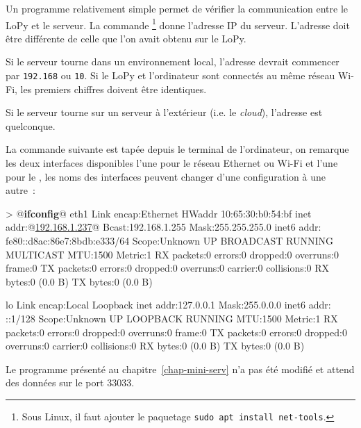 Un programme relativement simple permet de vérifier la communication entre le LoPy et le serveur. La commande \footnote{Sous Linux, il faut ajouter le paquetage  \texttt{sudo apt install net-tools}.} donne l'adresse IP du serveur. L'adresse doit être différente de celle que l'on avait obtenu sur le LoPy. 

Si le serveur tourne dans un environnement local, l'adresse devrait commencer par \texttt{192.168} ou \texttt{10}. Si le LoPy et l'ordinateur sont connectés au même réseau Wi-Fi, les premiers chiffres doivent être identiques. 

Si le serveur tourne sur un serveur à l'extérieur (i.e. le \textit{cloud}), l'adresse est quelconque.

     \vspace{1em}

La commande suivante est tapée depuis le terminal de l'ordinateur, on remarque les deux interfaces disponibles l'une pour le réseau Ethernet ou Wi-Fi et l'une pour le \textit{}, les noms des interfaces peuvent changer d'une configuration à une autre~:

\begin{termc}[backgroundcolor=\color{palerod}, language=json, basicstyle=\ttfamily\small, escapechar=@]
> @\textbf{ifconfig}@
eth1      Link encap:Ethernet  HWaddr 10:65:30:b0:54:bf
          inet addr:@\ul{192.168.1.237}@  Bcast:192.168.1.255  Mask:255.255.255.0
          inet6 addr: fe80::d8ac:86e7:8bdb:e333/64 Scope:Unknown
          UP BROADCAST RUNNING MULTICAST  MTU:1500  Metric:1
          RX packets:0 errors:0 dropped:0 overruns:0 frame:0
          TX packets:0 errors:0 dropped:0 overruns:0 carrier:0
          collisions:0
          RX bytes:0 (0.0 B)  TX bytes:0 (0.0 B)

lo        Link encap:Local Loopback
          inet addr:127.0.0.1  Mask:255.0.0.0
          inet6 addr: ::1/128 Scope:Unknown
          UP LOOPBACK RUNNING  MTU:1500  Metric:1
          RX packets:0 errors:0 dropped:0 overruns:0 frame:0
          TX packets:0 errors:0 dropped:0 overruns:0 carrier:0
          collisions:0
          RX bytes:0 (0.0 B)  TX bytes:0 (0.0 B)
\end{termc}

Le programme  présenté au chapitre~\vref{chap-mini-serv} n'a pas été modifié et attend des données sur le port 33033.

     \vspace{1em}

